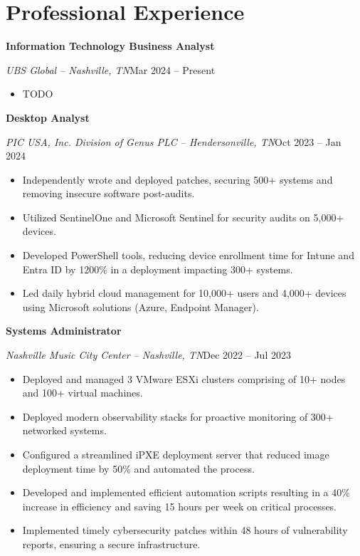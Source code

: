 \documentclass[a4paper]{article}
\begin{document}
\begin{minipage}[t]{0.62\textwidth}
    \raggedright
    \vspace*{0pt}

    \section{Professional Experience}
    \textbf{Information Technology Business Analyst}\par
    \textit{UBS Global -- Nashville, TN}\hfill Mar 2024 -- Present

    \begin{itemize}[noitemsep,nolistsep]
        \item TODO
    \end{itemize}

    \vspace{0.5em}
    \textbf{Desktop Analyst}\par
    \textit{PIC USA, Inc. Division of Genus PLC -- Hendersonville, TN}\hfill Oct 2023 -- Jan 2024

    \begin{itemize}[noitemsep,nolistsep]
        \item Independently wrote and deployed patches, securing 500+ systems and removing insecure software post-audits.
        \item Utilized SentinelOne and Microsoft Sentinel for security audits on 5,000+ devices.
        \item Developed PowerShell tools, reducing device enrollment time for Intune and Entra ID by 1200\% in a deployment impacting 300+ systems.
        \item Led daily hybrid cloud management for 10,000+ users and 4,000+ devices using Microsoft solutions (Azure, Endpoint Manager).
    \end{itemize}

    \vspace{0.5em}
    \textbf{Systems Administrator}\par
    \textit{Nashville Music City Center -- Nashville, TN}\hfill Dec 2022 -- Jul 2023

    \begin{itemize}[noitemsep,nolistsep]
        \item Deployed and managed 3 VMware ESXi clusters comprising of 10+ nodes and 100+ virtual machines.
        \item Deployed modern observability stacks for proactive monitoring of 300+ networked systems.
        \item Configured a streamlined iPXE deployment server that reduced image deployment time by 50\% and automated the process.
        \item Developed and implemented efficient automation scripts resulting in a 40\% increase in efficiency and saving 15 hours per week on critical processes.
        \item Implemented timely cybersecurity patches within 48 hours of vulnerability reports, ensuring a secure infrastructure.
    \end{itemize}


\end{minipage}
\end{document}

